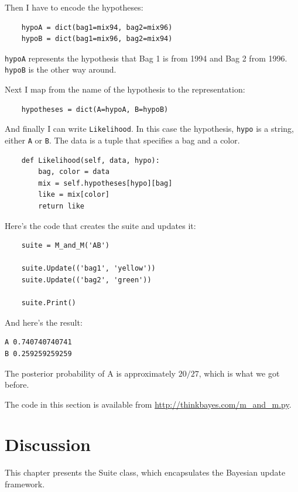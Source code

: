 \documentclass[12pt]{book}
\begin{document}
Then I have to encode the hypotheses:

\begin{verbatim}
    hypoA = dict(bag1=mix94, bag2=mix96)
    hypoB = dict(bag1=mix96, bag2=mix94)
\end{verbatim}

\verb"hypoA" represents the hypothesis that Bag 1 is from
1994 and Bag 2 from 1996.  \verb"hypoB" is the other way
around.

Next I map from the name of the hypothesis to the representation:

\begin{verbatim}
    hypotheses = dict(A=hypoA, B=hypoB)
\end{verbatim}

And finally I can write \verb"Likelihood".  In this case
the hypothesis, \verb"hypo" is a string, either \verb"A" or \verb"B".
The data is a tuple that specifies a bag
and a color.

\begin{verbatim}
    def Likelihood(self, data, hypo):
        bag, color = data
        mix = self.hypotheses[hypo][bag]
        like = mix[color]
        return like
\end{verbatim}

Here's the code that creates the suite and updates it:

\begin{verbatim}
    suite = M_and_M('AB')

    suite.Update(('bag1', 'yellow'))
    suite.Update(('bag2', 'green'))

    suite.Print()
\end{verbatim}

And here's the result:

\begin{verbatim}
A 0.740740740741
B 0.259259259259
\end{verbatim}

The posterior probability of A is approximately $20/27$, which
is what we got before.

The code in this section is available from
\url{http://thinkbayes.com/m_and_m.py}.


\section{Discussion}

This chapter presents the Suite class, which encapsulates the 
Bayesian update framework.
\end{document}
